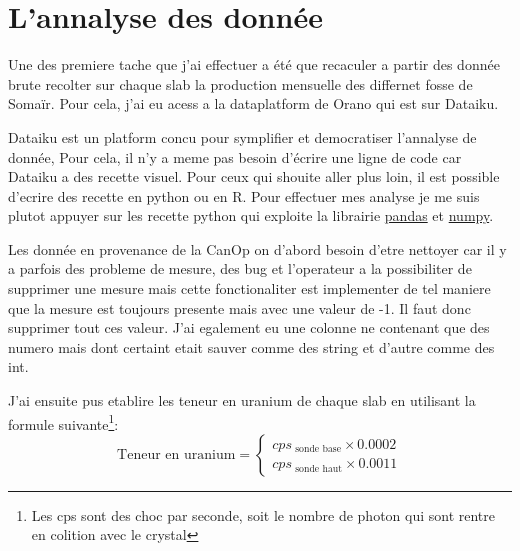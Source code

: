 
\section{L'annalyse des donnée}
Une des premiere tache que j'ai effectuer a été que recaculer a partir des donnée brute recolter sur chaque slab la production mensuelle des differnet fosse de Somaïr. Pour cela, j'ai eu acess a la dataplatform de Orano qui est sur Dataiku. 

Dataiku est un platform concu pour symplifier et democratiser l'annalyse de donnée, Pour cela, il n'y a meme pas besoin d'écrire une ligne de code car Dataiku a des recette visuel. Pour ceux qui shouite aller plus loin, il est possible d'ecrire des recette en python ou en R. Pour effectuer mes analyse je me suis plutot appuyer sur les recette python qui exploite la librairie \href{https://pandas.pydata.org/}{pandas} et \href{https://numpy.org/}{numpy}.

Les donnée en provenance de la CanOp on d'abord besoin d'etre nettoyer car il y a parfois des probleme de mesure, des bug et l'operateur a la possibiliter de supprimer une mesure mais cette fonctionaliter est implementer de tel maniere que la mesure est toujours presente mais avec une valeur de -1. Il faut donc supprimer tout ces valeur. J'ai egalement eu une colonne ne contenant que des numero mais dont certaint etait sauver comme des string et d'autre comme des int.

J'ai ensuite pus etablire les teneur en uranium de chaque slab en utilisant la formule suivante\footnote{Les cps sont des choc par seconde, soit le nombre de photon qui sont rentre en colition avec le crystal}:
\[
    \text{Teneur en uranium} = 
    \begin{cases}
        cps_{\text{ sonde base}} \times 0.0002 \\
        cps_{\text{ sonde haut}} \times 0.0011
    \end{cases}
\]


